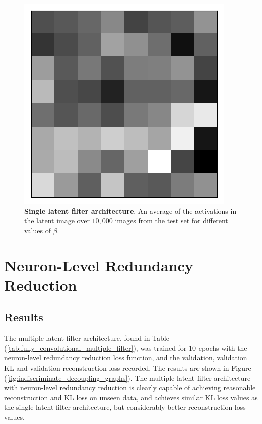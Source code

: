 \begin{figure}[h!]
\begin{multicols}{3}
    \includegraphics[scale=0.4]{figures/results/latent_image/beta_16_average_activation.png}
    \caption{$\beta=16$}
\end{multicols}
\caption{\textbf{Single latent filter architecture}. An average of the activations in the latent image over $10,000$ images from the test set for different values of $\beta$.}
\label{fig:latent_image_average_filters}
\end{figure}




\clearpage
%
%
%
%
%
\section{Neuron-Level Redundancy Reduction}

\subsection{Results}
The multiple latent filter architecture, found in Table (\ref{tab:fully_convolutional_multiple_filter}), was trained for $10$ epochs with the neuron-level redundancy reduction loss function, and the validation, validation KL and validation reconstruction loss recorded. The results are shown in Figure (\ref{fig:indiscriminate_decoupling_graphs}). The multiple latent filter architecture with neuron-level redundancy reduction is clearly capable of achieving reasonable reconstruction and KL loss on unseen data, and achieves similar KL loss values as the single latent filter architecture, but considerably better reconstruction loss values.

